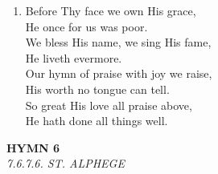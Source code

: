 \documentclass[11pt,a4paper]{article}
\begin{document}
\begin{enumerate}
    \item Before Thy face we own His grace, \\
        He once for us was poor. \\
        We bless His name, we sing His fame, \\
        He liveth evermore. \\
        Our hymn of praise with joy we raise, \\
        His worth no tongue can tell. \\
        So great His love all praise above, \\
        He hath done all things well.

\end{enumerate}

\newpage
\begin{center}
    {\Large \textbf{HYMN 6}}
    \\
    \textit{7.6.7.6. ST. ALPHEGE}
\end{center}
\vspace{1em}
\end{document}

